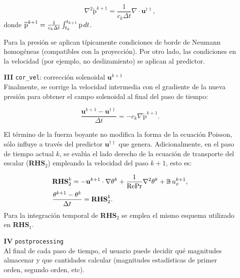 \begin{enumerate}
\begin{equation}
\nabla^2 \widetilde{\text{p}}^{k+1} = \frac{1}{c_k \Delta t} \nabla \cdot \mathbf{u}^{\dagger \dagger},
\end{equation}
donde $\widetilde{\text{p}}^{k+1}= \frac{1}{c_k \Delta t} \int^{t_{k+1}}_{t_k} \text{p} \hspace{0.5mm} dt$. 

Para la presión se aplican típicamente condiciones de borde de Neumann homogéneas (compatibles con la proyección). Por otro lado, las condiciones en la velocidad (por ejemplo, no deslizamiento) se aplican al predictor.

	\item[\textbf{III}]  \texttt{cor\_vel}: corrección solenoidal $\mathbf{u}^{k+1}$ \\
	Finalmente, se corrige la velocidad intermedia con el gradiente de la nueva presión para obtener
el campo solenoidal al final del paso de tiempo:

\begin{equation}
\frac{ \mathbf{u}^{k+1} - \mathbf{u}^{\dagger \dagger} }{\Delta t} = - c_k \nabla \widetilde{\text{p}}^{k+1} \text{.}
\label{eq:correccion}
\end{equation}

El término de la fuerza boyante no modifica la forma de la ecuación Poisson, sólo influye a través del predictor $\mathbf{u}^{\dagger \dagger}$ que genera. Adicionalmente, en el paso de tiempo actual $k$, se evalúa el lado derecho de la ecuación de transporte del escalar (\textbf{RHS}$_2$) empleando la velocidad del paso $k+1$, esto es:

\begin{equation}
\begin{aligned}
& \textbf{RHS}_2^k = - \mathbf{u}^{k+1} \cdot \nabla \theta^k + \frac{1}{\text{Re} \text{Pr}} \nabla^2 \theta^k + \mathbb{B} \hspace{0.5mm} u_x^{k+1}, \\
& \frac{\theta^{k+1} - \theta^{k}}{\Delta t} = \textbf{RHS}_2^k \text{.}
\end{aligned}
\end{equation}
Para la integración temporal de \textbf{RHS}$_2$ se emplea el mismo esquema utilizado en \textbf{RHS}$_1$.

\item[\textbf{IV}] \texttt{postprocessing} \\
Al final de cada paso de tiempo, el usuario puede decidir qué magnitudes almacenar y que cantidades calcular (magnitudes estadísticas de primer orden, segundo orden, etc).

\end{enumerate}

